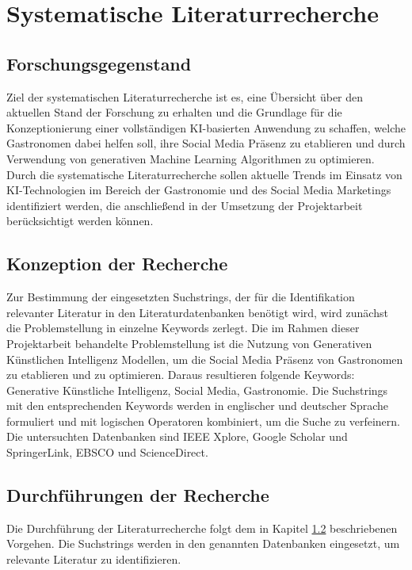 \documentclass[11pt]{article}
\begin{document}
\section{Systematische Literaturrecherche} \label{sec:literaturrecherche}
\subsection{Forschungsgegenstand}

Ziel der systematischen Literaturrecherche ist es, eine Übersicht über den aktuellen Stand der Forschung zu erhalten und die Grundlage für die Konzeptionierung einer vollständigen KI-basierten Anwendung zu schaffen, welche Gastronomen dabei helfen soll, ihre Social Media Präsenz zu etablieren und durch Verwendung von generativen Machine Learning Algorithmen zu optimieren.
Durch die systematische Literaturrecherche sollen aktuelle Trends im Einsatz von KI-Technologien im Bereich der Gastronomie und des Social Media Marketings identifiziert werden, die anschließend in der Umsetzung der Projektarbeit berücksichtigt werden können.

\subsection{Konzeption der Recherche} \label{sec:literaturrecherche_orga}

Zur Bestimmung der eingesetzten Suchstrings, der für die Identifikation relevanter Literatur in den Literaturdatenbanken benötigt wird, wird zunächst die Problemstellung in einzelne Keywords zerlegt.
Die im Rahmen dieser Projektarbeit behandelte Problemstellung ist die Nutzung von Generativen Künstlichen Intelligenz Modellen, um die Social Media Präsenz von Gastronomen zu etablieren und zu optimieren.
Daraus resultieren folgende Keywords: Generative Künstliche Intelligenz, Social Media, Gastronomie.
Die Suchstrings mit den entsprechenden Keywords werden in englischer und deutscher Sprache formuliert und mit logischen Operatoren kombiniert, um die Suche zu verfeinern.
Die untersuchten Datenbanken sind IEEE Xplore, Google Scholar und SpringerLink, EBSCO und ScienceDirect.

\subsection{Durchführungen der Recherche}

Die Durchführung der Literaturrecherche folgt dem in Kapitel \ref{sec:literaturrecherche_orga} beschriebenen Vorgehen.
Die Suchstrings werden in den genannten Datenbanken eingesetzt, um relevante Literatur zu identifizieren.
\end{document}
